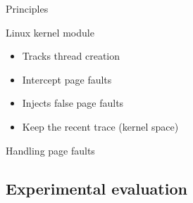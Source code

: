 \documentclass[xcolor={usenames,dvipsnames},hyperref={pdfusetitle}]{beamer}
\begin{document}
\begin{frame}{Principles}
    \begin{alertblock}{Linux kernel module}
        \begin{itemize}[<+->]
            \item Tracks thread creation
            \item Intercept page faults
            \item Injects false page faults
            \item Keep the recent trace (kernel space)
        \end{itemize}
    \end{alertblock}
\end{frame}

\begin{frame}{Handling page faults}
    \centering
    \resizebox{!}{.7\textheight}{
        
    }
\end{frame}

\subsection{Experimental evaluation}
\end{document}
